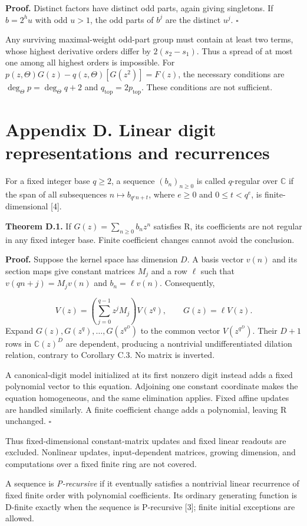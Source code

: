 \documentclass[11pt,a4paper]{article}
\begin{document}
\textbf{Proof.} Distinct factors have distinct odd parts, again giving singletons. If $b=2^hu$ with odd $u>1$, the odd parts of $b^j$ are the distinct $u^j$. $\square$

Any surviving maximal-weight odd-part group must contain at least two terms, whose highest derivative orders differ by $2(s_2-s_1)$. Thus a spread of at most one among all highest orders is impossible. For $p(z,\Theta)G(z)-q(z,\Theta)[G(z^2)]=F(z)$, the necessary conditions are $\deg_\Theta p=\deg_\Theta q+2$ and $q_{\mathrm{top}}=2p_{\mathrm{top}}$. These conditions are not sufficient.

\section*{Appendix D. Linear digit representations and recurrences}
For a fixed integer base $q\ge2$, a sequence $(b_n)_{n\ge0}$ is called $q$-regular over $\mathbb C$ if the span of all subsequences $n\mapsto b_{q^en+t}$, where $e\ge0$ and $0\le t<q^e$, is finite-dimensional [4].

\textbf{Theorem D.1.} If $G(z)=\sum_{n\ge0}b_nz^n$ satisfies R, its coefficients are not regular in any fixed integer base. Finite coefficient changes cannot avoid the conclusion.

\textbf{Proof.} Suppose the kernel space has dimension $D$. A basis vector $v(n)$ and its section maps give constant matrices $M_j$ and a row $\ell$ such that $v(qn+j)=M_jv(n)$ and $b_n=\ell v(n)$. Consequently,

\[
V(z)=\left(\sum_{j=0}^{q-1}z^jM_j\right)V(z^q),\qquad G(z)=\ell V(z).
\]
Expand $G(z),G(z^q),\ldots,G(z^{q^D})$ to the common vector $V(z^{q^D})$. Their $D+1$ rows in $\mathbb C(z)^D$ are dependent, producing a nontrivial undifferentiated dilation relation, contrary to Corollary C.3. No matrix is inverted.

A canonical-digit model initialized at its first nonzero digit instead adds a fixed polynomial vector to this equation. Adjoining one constant coordinate makes the equation homogeneous, and the same elimination applies. Fixed affine updates are handled similarly. A finite coefficient change adds a polynomial, leaving R unchanged. $\square$

Thus fixed-dimensional constant-matrix updates and fixed linear readouts are excluded. Nonlinear updates, input-dependent matrices, growing dimension, and computations over a fixed finite ring are not covered.

A sequence is \emph{P-recursive} if it eventually satisfies a nontrivial linear recurrence of fixed finite order with polynomial coefficients. Its ordinary generating function is D-finite exactly when the sequence is P-recursive [3]; finite initial exceptions are allowed.
\end{document}
